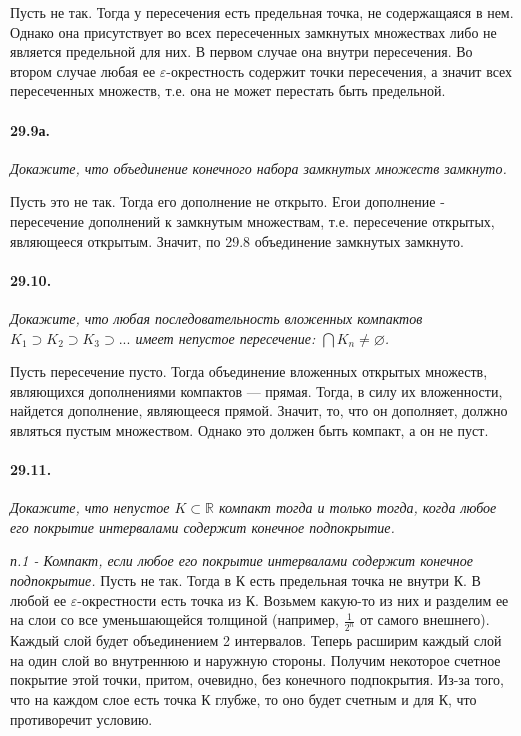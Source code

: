 \documentclass{book}
\begin{document}
Пусть не так. Тогда у пересечения есть предельная точка, не содержащаяся в нем. Однако она присутствует во всех пересеченных замкнутых множествах либо не является предельной для них. В первом случае она внутри пересечения. Во втором случае любая ее $\varepsilon$-окрестность содержит точки пересечения, а значит всех пересеченных множеств, т.е. она не может перестать быть предельной.

\paragraph{29.9а.}
\textit{Докажите, что объединение конечного набора замкнутых множеств замкнуто.}

Пусть это не так. Тогда его дополнение не открыто. Егои дополнение - пересечение дополнений к замкнутым множествам, т.е. пересечение открытых, являющееся открытым. Значит, по 29.8 объединение замкнутых замкнуто.

\paragraph{29.10.}
\textit{Докажите, что любая последовательность вложенных компактов $K_1 \supset K_2 \supset K_3 \supset ... $ имеет непустое пересечение: $\bigcap K_n \neq \varnothing $.}

Пусть пересечение пусто. Тогда объединение вложенных открытых множеств, являющихся дополнениями компактов --- прямая. Тогда, в силу их вложенности, найдется дополнение, являющееся прямой. Значит, то, что он дополняет, должно являться пустым множеством. Однако это должен быть компакт, а он не пуст. 

\paragraph{29.11.}
\textit{Докажите, что непустое $K \subset \mathbb{R}$ компакт
тогда и только тогда, когда любое его покрытие интервалами содержит конечное подпокрытие.}

\textit{п.1 - Компакт, если любое его покрытие интервалами содержит конечное подпокрытие.} Пусть не так. Тогда в К есть предельная точка не внутри К. В любой ее $\varepsilon$-окрестности есть точка из К. Возьмем какую-то из них и разделим ее на слои со все уменьшающейся толщиной (например, $\frac{1}{2^n}$ от самого внешнего). Каждый слой будет объединением 2 интервалов. Теперь расширим каждый слой на один слой во внутреннюю и наружную стороны. Получим некоторое счетное покрытие этой точки, притом, очевидно, без конечного подпокрытия. Из-за того, что на каждом слое есть точка К глубже, то оно будет счетным и для К, что противоречит условию.
\end{document}
